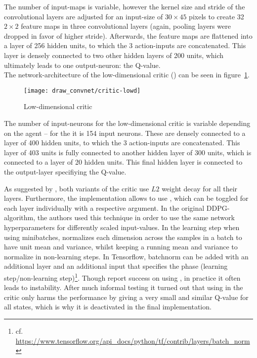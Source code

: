 The number of input-maps is variable, however the kernel size and stride of the convolutional layers are adjusted for an input-size of $30\times45$ pixels to create 32 $2\times2$ feature maps in three convolutional layers (again, pooling layers were dropped in favor of higher stride).  Afterwards, the feature maps are flattened into a layer of 256 hidden units, to which the 3 action-inputs are concatenated. This layer is densely connected to two other hidden layers of 200 units, which ultimately leads to one output-neuron: the Q-value.\\

\noindent The network-architecture of the low-dimensional critic () can be seen in figure~\ref{fig:lowdcrit}.

\begin{figure}[h]
	\centering 
	\texttt{[image: draw\_convnet/critic-lowd]}
	\caption{Low-dimensional critic}
	\label{fig:lowdcrit}
\end{figure}

The number of input-neurons for the low-dimensional critic is variable depending on the agent -- for the  it is 154 input neurons. These are densely connected to a layer of 400 hidden units, to which the 3 action-inputs are concatenated. This layer of 403 units is fully connected to another hidden layer of 300 units, which is connected to a layer of 20 hidden units. This final hidden layer is connected to the output-layer specifiying the Q-value.

As suggested by \cite{lillicrap_continuous_2015}, both variants of the critic use $L2$ weight decay for all their layers. Furthermore, the implementation allows to use \cite{ioffe_batch_2015}, which can be toggled for each layer individually with a respective argument. In the original DDPG-algorithm, the authors used this technique in order to use the same network hyperparameters for differently scaled input-values. In the learning step when using minibatches, \batchnorm normalizes each dimension across the samples in a batch to have unit mean and variance, whilst keeping a running mean and variance to normalize in non-learning steps. In Tensorflow, batchnorm can be added with an additional layer and an additional input that specifies the phase (learning step/non-learning step)\footnote{cf. \url{https://www.tensorflow.org/api\_docs/python/tf/contrib/layers/batch_norm}}. Though \cite{lillicrap_continuous_2015} report success on using \batchnorm, in practice it often leads to instability. After much informal testing it turned out that using \batchnorm in the critic only harms the performance by giving a very small and similar Q-value for all states, which is why it is deactivated in the final implementation.

